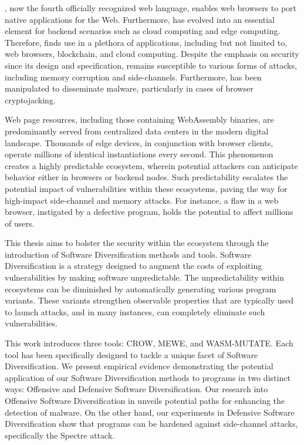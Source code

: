\Wasm, now the fourth officially recognized web language, enables web browsers to port native applications for the Web. 
Furthermore, \Wasm has evolved into an essential element for backend scenarios such as cloud computing and edge computing. 
Therefore, \Wasm finds use in a plethora of applications, including but not limited to, web browsers, blockchain, and cloud computing. 
Despite the emphasis on security since its design and specification, \Wasm remains susceptible to various forms of attacks, including memory corruption and side-channels. 
Furthermore, \Wasm has been manipulated to disseminate malware, particularly in cases of browser cryptojacking. 

Web page resources, including those containing WebAssembly binaries, are predominantly served from centralized data centers in the modern digital landscape. 
Thousands of edge devices, in conjunction with browser clients, operate millions of identical \Wasm instantiations every second. 
This phenomenon creates a highly predictable ecosystem, wherein potential attackers can anticipate behavior either in browsers or backend nodes. 
Such predictability escalates the potential impact of vulnerabilities within these ecosystems, paving the way for high-impact side-channel and memory attacks. 
For instance, a flaw in a web browser, instigated by a defective \Wasm program, holds the potential to affect millions of users.


This thesis aims to bolster the security within the \Wasm ecosystem through the introduction of Software Diversification methods and tools. 
Software Diversification is a strategy designed to augment the costs of exploiting vulnerabilities by making software unpredictable.
The unpredictability within ecosystems can be diminished by automatically generating various program variants. 
These variants strengthen observable properties that are typically used to launch attacks, and in many instances, can completely eliminate such vulnerabilities. 


This work introduces three tools: CROW, MEWE, and WASM-MUTATE. 
Each tool has been specifically designed to tackle a unique facet of Software Diversification. 
We present empirical evidence demonstrating the potential application of our Software Diversification methods to \Wasm programs in two distinct ways: Offensive and Defensive Software Diversification. 
Our research into Offensive Software Diversification in \Wasm unveils potential paths for enhancing the detection of \Wasm malware. 
On the other hand, our experiments in Defensive Software Diversification show that \Wasm programs can be hardened against side-channel attacks, specifically the Spectre attack.


